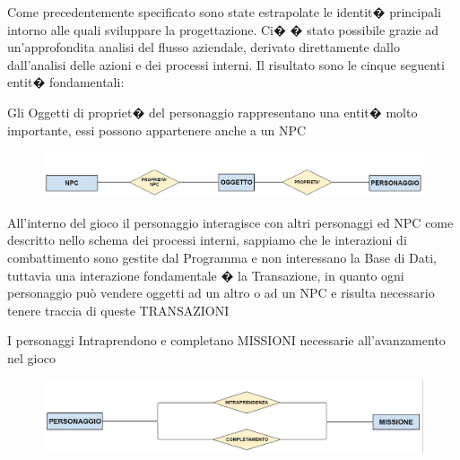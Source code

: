 Come precedentemente specificato sono state estrapolate le identit� principali intorno alle quali sviluppare la progettazione. Ci� � stato possibile grazie ad un'approfondita analisi del flusso aziendale, derivato direttamente dallo dall'analisi delle azioni e dei processi interni.\newline
Il risultato sono le cinque seguenti entit� fondamentali: \newline

\noindent{}


Gli Oggetti di propriet� del personaggio rappresentano una entit� molto importante, essi possono appartenere anche a un NPC

\begin{figure}[H]
\centering
\includegraphics[width=0.7\linewidth]{./immagini/oggettotriplo.png}
\end{figure}


All'interno del gioco il personaggio interagisce con altri personaggi ed NPC come descritto nello schema dei processi interni,
sappiamo che le interazioni di combattimento sono gestite dal Programma e non interessano la Base di Dati, tuttavia una interazione fondamentale �
la Transazione, in quanto ogni personaggio pu\`{o} vendere oggetti ad un altro o ad un NPC e risulta necessario tenere traccia di queste TRANSAZIONI

I personaggi Intraprendono e completano MISSIONI necessarie all'avanzamento nel gioco

\begin{figure}[H]
\centering
\includegraphics[width=0.7\linewidth]{./immagini/persomiss.png}
\end{figure}


